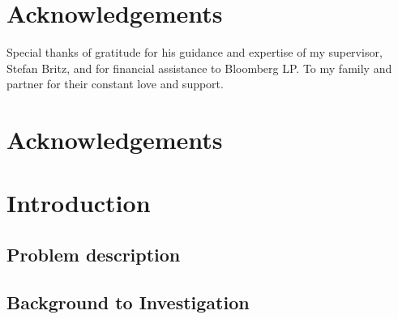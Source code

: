 \documentclass[12pt,a4paper,oneside]{report}
\begin{document}

\chapter*{\centering \large Acknowledgements}
Special thanks of gratitude for his guidance and expertise of my supervisor, Stefan Britz, and for financial assistance to Bloomberg LP. To my family and partner for their constant love and support. 




\tableofcontents
\cleardoublepage
\listoftables
\listoffigures 
\makegloss
\newpage


\chapter*{\centering \large Acknowledgements}


\chapter{Introduction}

\section{Problem description}

\section{Background to Investigation}
\end{document}
